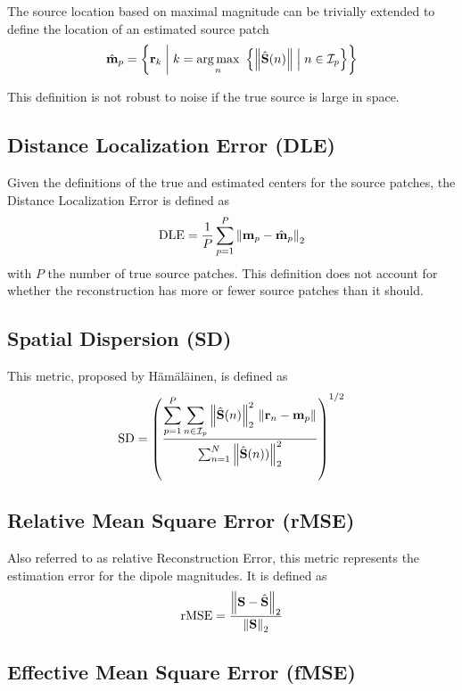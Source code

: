 The source location based on maximal magnitude can be trivially extended to define the location of an estimated source patch
\begin{equation}
    \hat{\mathbf{m}}_p = \left\{ \mathbf{r}_k \;\middle|\; k = \operatorname*{arg\,max}_n\,\,
    \left\{ \left\lVert \hat{\mathbf{S}}(n) \right\rVert \;\middle|\; n\in \mathcal{I}_p  \right\}
     \right\}
\end{equation}

This definition is not robust to noise if the true source is large in space.

\subsection{Distance Localization Error (DLE)}

Given the definitions of the true and estimated centers for the source patches, the Distance Localization Error is defined as
\begin{equation}
\text{DLE} = 
\frac{1}{P} \sum_{p=1}^P \left\lVert  \mathbf{m}_p - \hat{\mathbf{m}}_p  \right\rVert_2
\label{def:DLE}
\end{equation}
with $P$ the number of true source patches.
%
This definition does not account for whether the reconstruction has more or fewer source patches than it should.

\subsection{Spatial Dispersion (SD)}

This metric, proposed by H\"{a}m\"{a}l\"{a}inen, is defined as
\begin{equation}
\text{SD}
=
\left( 
\frac{ \displaystyle
\sum_{p=1}^P \sum_{n\in \mathcal{I}_p} \left\lVert \hat{\mathbf{S}}(n) \right\rVert_2^2\, \left\lVert \mathbf{r}_n-\mathbf{m}_p \right\rVert }{\sum_{n=1}^N \left\lVert \hat{\mathbf{S}}(n)) \right\rVert_2^2}
 \right)^{1/2}
\end{equation}

\subsection{Relative Mean Square Error (rMSE)}

Also referred to as relative Reconstruction Error, this metric represents the estimation error for the dipole magnitudes. 
%
It is defined as
\begin{equation}
\text{rMSE} = 
\frac{\left\lVert \mathbf{S} - \hat{\mathbf{S}} \right\rVert_2}{\left\lVert \mathbf{S} \right\rVert_2}
\end{equation}

\subsection{Effective Mean Square Error (fMSE)}

